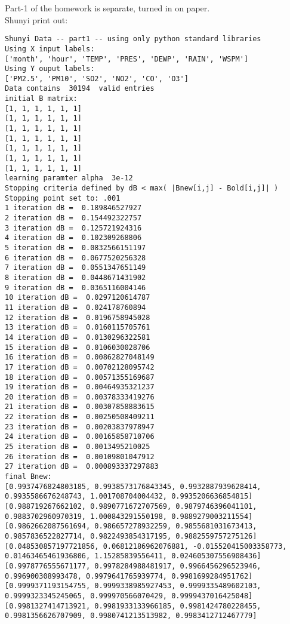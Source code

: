 \documentclass[11pt,a4paper]{article}
\begin{document}
Part-1 of the homework is separate, turned in on paper.\\
Shunyi print out:
\scriptsize
\begin{verbatim}
Shunyi Data -- part1 -- using only python standard libraries
Using X input labels:
['month', 'hour', 'TEMP', 'PRES', 'DEWP', 'RAIN', 'WSPM']
Using Y ouput labels:
['PM2.5', 'PM10', 'SO2', 'NO2', 'CO', 'O3']
Data contains  30194  valid entries
initial B matrix: 
[1, 1, 1, 1, 1, 1]
[1, 1, 1, 1, 1, 1]
[1, 1, 1, 1, 1, 1]
[1, 1, 1, 1, 1, 1]
[1, 1, 1, 1, 1, 1]
[1, 1, 1, 1, 1, 1]
[1, 1, 1, 1, 1, 1]
learning paramter alpha  3e-12
Stopping criteria defined by dB < max( |Bnew[i,j] - Bold[i,j]| )
Stopping point set to: .001
1 iteration dB =  0.189846527927
2 iteration dB =  0.154492322757
3 iteration dB =  0.125721924316
4 iteration dB =  0.102309268806
5 iteration dB =  0.0832566151197
6 iteration dB =  0.0677520256328
7 iteration dB =  0.0551347651149
8 iteration dB =  0.0448671431902
9 iteration dB =  0.0365116004146
10 iteration dB =  0.0297120614787
11 iteration dB =  0.024178760894
12 iteration dB =  0.0196758945028
13 iteration dB =  0.0160115705761
14 iteration dB =  0.0130296322581
15 iteration dB =  0.0106030028706
16 iteration dB =  0.00862827048149
17 iteration dB =  0.00702128095742
18 iteration dB =  0.00571355169687
19 iteration dB =  0.00464935321237
20 iteration dB =  0.00378333419276
21 iteration dB =  0.00307858883615
22 iteration dB =  0.00250508409211
23 iteration dB =  0.00203837978947
24 iteration dB =  0.00165858710706
25 iteration dB =  0.0013495210025
26 iteration dB =  0.00109801047912
27 iteration dB =  0.000893337297883
final Bnew:
[0.9937476824803185, 0.9938573176843345, 0.9932887939628414, 0.9935586676248743, 1.001708704004432, 0.9935206636854815]
[0.988719267662102, 0.9890771672707569, 0.9879746396041101, 0.9883702960970319, 1.000843291550198, 0.9889279003211554]
[0.9862662087561694, 0.986657278932259, 0.9855681031673413, 0.9857836522827714, 0.9822493854317195, 0.9882559757275126]
[0.048530857197721856, 0.06812186962076881, -0.015520415003358773, 0.01463465461936806, 1.15285839556411, 0.024605307556908436]
[0.9978776555671177, 0.9978284988481917, 0.9966456296523946, 0.996900308993478, 0.9979641765939774, 0.9981699284951762]
[0.9999371193154755, 0.9999338985927453, 0.9999335489602103, 0.9999323345245065, 0.999970566070429, 0.9999437016425048]
[0.9981327414713921, 0.9981933133966185, 0.9981424780228455, 0.9981356626707909, 0.9980741213513982, 0.9983412712467779]
 

\end{verbatim}
\end{document}
